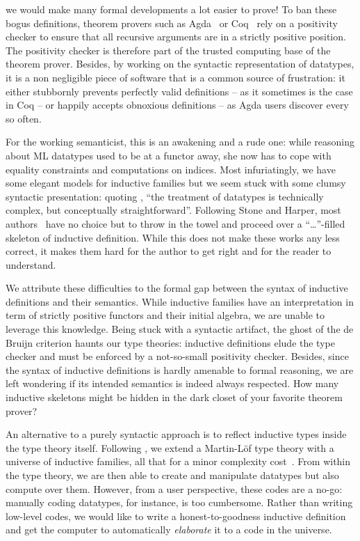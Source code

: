 \documentclass{scrartcl}
\theoremstyle{plain}
\theoremstyle{definition}
\begin{document}
we would make many formal developments a lot easier to prove! To ban
these bogus definitions, theorem provers such as
Agda~\citep{norell:agda} or Coq~\citep{coq} rely on a positivity
checker to ensure that all recursive arguments are in a
strictly positive position.
The positivity checker is therefore part of the trusted computing base
of the theorem prover. Besides, by working on the syntactic
representation of datatypes, it is a non negligible piece of software
that is a common source of frustration: it either stubbornly prevents
perfectly valid definitions -- as it sometimes is the case in Coq --
or happily accepts obnoxious definitions -- as Agda users discover
every so often.



For the working semanticist, this is an awakening and a rude one:
while reasoning about ML datatypes used to be at a functor away, she
now has to cope with equality constraints and computations on
indices. Most infuriatingly, we have some elegant models for inductive
families but we seem stuck with some clumsy syntactic presentation:
quoting \citet{harper:elaboration}, ``the treatment of datatypes is
technically complex, but conceptually straightforward''. Following
Stone and Harper, most authors~\citep{coen:refinement,luo:utt,
  mcbride:construction-constructor} have no choice but to throw in the
towel and proceed over a ``\ldots''-filled skeleton of inductive
definition. While this does not make these works any less correct, it
makes them hard for the author to get right and for the reader to
understand.



We attribute these difficulties to the formal gap between the syntax
of inductive definitions and their semantics. While inductive families
have an interpretation in term of strictly positive functors and their
initial algebra, we are unable to leverage this knowledge. Being stuck
with a syntactic artifact, the ghost of the de Bruijn criterion haunts
our type theories: inductive definitions elude the type checker and
must be enforced by a not-so-small positivity checker. Besides, since
the syntax of inductive definitions is hardly amenable to formal
reasoning, we are left wondering if its intended semantics is indeed
always respected. How many inductive skeletons might be hidden in the
dark closet of your favorite theorem prover?



An alternative to a purely syntactic approach is to reflect inductive
types inside the type theory itself. Following
\citet{benke:universe-generic-prog}, we extend a Martin-L\"{o}f type
theory with a universe of inductive families, all that for a minor
complexity cost~\citep{dagand:levitation}. From within the type
theory, we are then able to create and manipulate datatypes but also
compute over them. However, from a user perspective, these codes are a
no-go: manually coding datatypes, for instance, is too cumbersome. Rather
than writing low-level codes, we would like to write a
honest-to-goodness inductive definition and get the computer to
automatically \emph{elaborate} it to a code in the universe.
\end{document}
